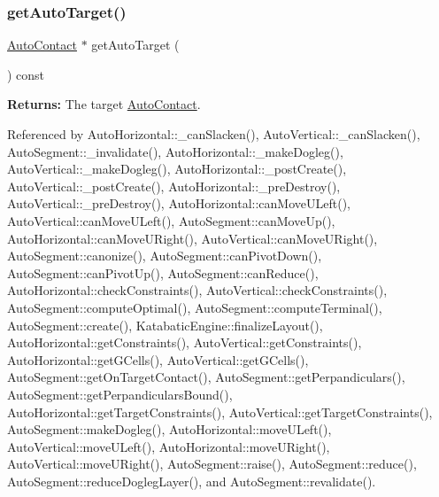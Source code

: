 \mbox{\label{classKatabatic_1_1AutoSegment_afa494ddc031f4dd1c24999ff83fb878c}} 
\subsubsection{\texorpdfstring{get\+Auto\+Target()}{getAutoTarget()}}
{\footnotesize\ttfamily \hyperlink{classKatabatic_1_1AutoContact}{Auto\+Contact} $\ast$ get\+Auto\+Target (\begin{DoxyParamCaption}{ }\end{DoxyParamCaption}) const\hspace{0.3cm}{\ttfamily [inline]}}

{\bfseries Returns\+:} The target \hyperlink{classKatabatic_1_1AutoContact}{Auto\+Contact}. 

Referenced by Auto\+Horizontal\+::\+\_\+can\+Slacken(), Auto\+Vertical\+::\+\_\+can\+Slacken(), Auto\+Segment\+::\+\_\+invalidate(), Auto\+Horizontal\+::\+\_\+make\+Dogleg(), Auto\+Vertical\+::\+\_\+make\+Dogleg(), Auto\+Horizontal\+::\+\_\+post\+Create(), Auto\+Vertical\+::\+\_\+post\+Create(), Auto\+Horizontal\+::\+\_\+pre\+Destroy(), Auto\+Vertical\+::\+\_\+pre\+Destroy(), Auto\+Horizontal\+::can\+Move\+U\+Left(), Auto\+Vertical\+::can\+Move\+U\+Left(), Auto\+Segment\+::can\+Move\+Up(), Auto\+Horizontal\+::can\+Move\+U\+Right(), Auto\+Vertical\+::can\+Move\+U\+Right(), Auto\+Segment\+::canonize(), Auto\+Segment\+::can\+Pivot\+Down(), Auto\+Segment\+::can\+Pivot\+Up(), Auto\+Segment\+::can\+Reduce(), Auto\+Horizontal\+::check\+Constraints(), Auto\+Vertical\+::check\+Constraints(), Auto\+Segment\+::compute\+Optimal(), Auto\+Segment\+::compute\+Terminal(), Auto\+Segment\+::create(), Katabatic\+Engine\+::finalize\+Layout(), Auto\+Horizontal\+::get\+Constraints(), Auto\+Vertical\+::get\+Constraints(), Auto\+Horizontal\+::get\+G\+Cells(), Auto\+Vertical\+::get\+G\+Cells(), Auto\+Segment\+::get\+On\+Target\+Contact(), Auto\+Segment\+::get\+Perpandiculars(), Auto\+Segment\+::get\+Perpandiculars\+Bound(), Auto\+Horizontal\+::get\+Target\+Constraints(), Auto\+Vertical\+::get\+Target\+Constraints(), Auto\+Segment\+::make\+Dogleg(), Auto\+Horizontal\+::move\+U\+Left(), Auto\+Vertical\+::move\+U\+Left(), Auto\+Horizontal\+::move\+U\+Right(), Auto\+Vertical\+::move\+U\+Right(), Auto\+Segment\+::raise(), Auto\+Segment\+::reduce(), Auto\+Segment\+::reduce\+Dogleg\+Layer(), and Auto\+Segment\+::revalidate().

